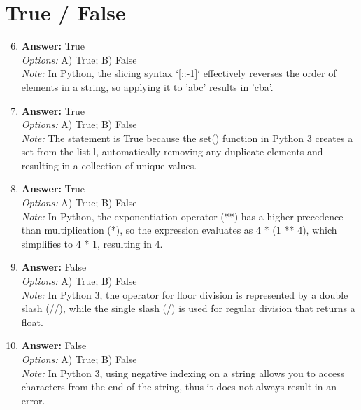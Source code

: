 \documentclass[12pt]{article}
\begin{document}
\section*{True / False}
\begin{enumerate}[label=\arabic*.]
\setcounter{enumi}{5}
\item \textbf{Answer:} True
\\ \textit{Options:} A) True; B) False
\\ \textit{Note:} In Python, the slicing syntax `[::-1]` effectively reverses the order of elements in a string, so applying it to 'abc' results in 'cba'.
\item \textbf{Answer:} True
\\ \textit{Options:} A) True; B) False
\\ \textit{Note:} The statement is True because the set() function in Python 3 creates a set from the list l, automatically removing any duplicate elements and resulting in a collection of unique values.
\item \textbf{Answer:} True
\\ \textit{Options:} A) True; B) False
\\ \textit{Note:} In Python, the exponentiation operator (**) has a higher precedence than multiplication (*), so the expression evaluates as 4 * (1 ** 4), which simplifies to 4 * 1, resulting in 4.
\item \textbf{Answer:} False
\\ \textit{Options:} A) True; B) False
\\ \textit{Note:} In Python 3, the operator for floor division is represented by a double slash (//), while the single slash (/) is used for regular division that returns a float.
\item \textbf{Answer:} False
\\ \textit{Options:} A) True; B) False
\\ \textit{Note:} In Python 3, using negative indexing on a string allows you to access characters from the end of the string, thus it does not always result in an error.
\end{enumerate}
\end{document}
